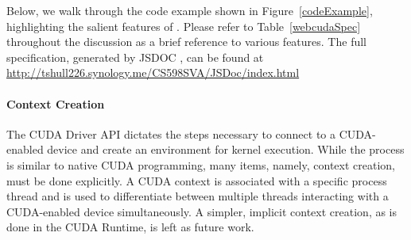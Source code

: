 Below, we walk through the code example shown in Figure~\ref{codeExample},
highlighting the salient features of \namens. Please refer to
Table~\ref{webcudaSpec} throughout the discussion as a brief reference to
various \name features. The full \name specification, generated by JSDOC
\cite{JSDOC}, can be found at
\url{http://tshull226.synology.me/CS598SVA/JSDoc/index.html}


\begin{figure*}
	\begin{center}
		\small
		
	\end{center}
	\caption{Simple \name Example}
	\label{codeExample}
\end{figure*}

\paragraph{Context Creation} The CUDA Driver API dictates the steps necessary to
connect to a CUDA-enabled device and create an environment for kernel execution.
While the process is similar to native CUDA programming, many items, namely,
context creation, must be done explicitly. A CUDA context is associated with a
specific process thread and is used to differentiate between multiple
threads interacting with a CUDA-enabled device simultaneously.  A simpler, implicit context creation, as is
done in the CUDA Runtime, is left as future work.

